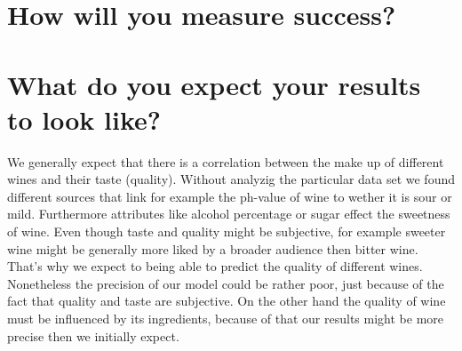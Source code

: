 \documentclass[11pt,titlepage,oneside,openany]{article}
\begin{document}
\section{How will you measure success?}

\section{What do you expect your results to look like?}
We generally expect that there is a correlation between the make up of different wines and their taste (quality). Without analyzig the particular data set we found different sources that link for example the ph-value of wine to wether it is sour or mild. Furthermore attributes like alcohol percentage or sugar effect the sweetness of wine. Even though taste and quality might be subjective, for example sweeter wine might be generally more liked by a broader audience then bitter wine. That's why we expect to being able to predict the quality of different wines. Nonetheless the precision of our model could be rather poor, just because of the fact that quality and taste are subjective. On the other hand the quality of wine must be influenced by its ingredients, because of that our results might be more precise then we initially expect.

%
%









\end{document}
